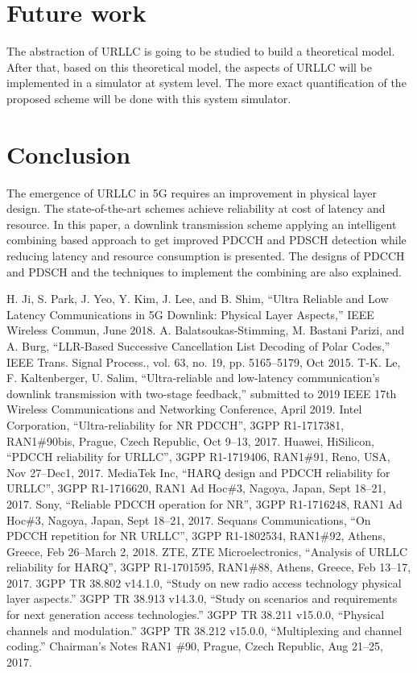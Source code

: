\documentclass[conference]{IEEEtran}
\begin{document}
\section{Future work}
The abstraction of URLLC is going to be studied to build a theoretical model. After that, based on this theoretical model, the aspects of URLLC will be implemented in a simulator at system level. The more exact quantification of the proposed scheme will be done with this system simulator.

\section{Conclusion}

The emergence of URLLC in 5G requires an improvement in physical layer design. The state-of-the-art schemes achieve reliability at cost of latency and resource. In this paper, a downlink transmission scheme applying an intelligent combining based approach to get improved PDCCH and PDSCH detection while reducing latency and resource consumption is presented. The designs of PDCCH and PDSCH and the techniques to implement the combining are also explained. 

\begin{thebibliography}{00}
 H. Ji, S. Park, J. Yeo, Y. Kim, J. Lee, and B. Shim, “Ultra Reliable and Low Latency Communications in 5G Downlink: Physical Layer Aspects,”  IEEE Wireless Commun, June 2018.
 A. Balatsoukas-Stimming, M. Bastani Parizi, and A. Burg, ``LLR-Based Successive Cancellation List Decoding of Polar Codes,'' IEEE Trans. Signal Process., vol. 63, no. 19, pp. 5165–5179, Oct 2015.
 T-K. Le, F. Kaltenberger, U. Salim, ``Ultra-reliable and low-latency communication's downlink transmission with two-stage feedback,'' submitted to 2019 IEEE 17th Wireless Communications and Networking Conference, April 2019.
 Intel Corporation, ``Ultra-reliability for NR PDCCH'', 3GPP R1-1717381, RAN1\#90bis, Prague, Czech Republic, Oct 9--13, 2017.
 Huawei, HiSilicon, ``PDCCH reliability for URLLC'', 3GPP R1-1719406, RAN1\#91, Reno, USA, Nov 27--Dec1, 2017.
 MediaTek Inc, ``HARQ design and PDCCH reliability for URLLC'', 3GPP R1-1716620, RAN1 Ad Hoc\#3, Nagoya, Japan, Sept 18--21, 2017.
 Sony, ``Reliable PDCCH operation for NR'', 3GPP R1-1716248, RAN1 Ad Hoc\#3, Nagoya, Japan, Sept 18--21, 2017.
 Sequans Communications, ``On PDCCH repetition for NR URLLC'', 3GPP R1-1802534, RAN1\#92, Athens, Greece, Feb 26--March 2, 2018.
 ZTE, ZTE Microelectronics, ``Analysis of URLLC reliability for HARQ'', 3GPP R1-1701595, RAN1\#88, Athens, Greece, Feb 13--17, 2017.
 3GPP TR 38.802 v14.1.0, ``Study on new radio access technology physical layer aspects.''
 3GPP TR 38.913 v14.3.0, ``Study on scenarios and requirements for next generation access technologies.''
 3GPP TR 38.211 v15.0.0, ``Physical channels and modulation.''
 3GPP TR 38.212 v15.0.0, ``Multiplexing and channel coding.''
 Chairman's Notes RAN1 \#90, Prague, Czech Republic, Aug 21--25, 2017.

\end{thebibliography}
\vspace{12pt}
\end{document}
